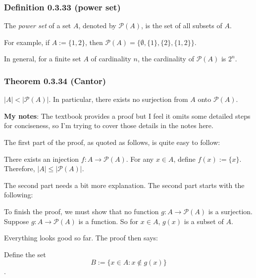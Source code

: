 \documentclass[12pt, letterpaper, oneside]{book}
\begin{document}
\subsubsection{Definition 0.3.33 (power set)}

The \textit{power set} of a set $A$, denoted by $\mathcal{P}(A)$, is the set of
all subsets of $A$.

For example, if $A := \{1, 2\}$, then $\mathcal{P}(A) = \{\emptyset, \{1\},
  \{2\}, \{1, 2\}\}$.

In general, for a finite set $A$ of cardinality $n$, the cardinality of
$\mathcal{P}(A)$ is $2^n$.

\subsubsection{Theorem 0.3.34 (Cantor)}

$|A| < |\mathcal{P}(A)|$. In particular, there exists no surjection from $A$
onto $\mathcal{P}(A)$.

\colorbox{lime!100}{\textbf{My notes}}: The textbook provides a proof but I
feel it omits some detailed steps for conciseness, so I'm trying to cover those
details in the notes here.

The first part of the proof, as quoted as follows, is quite easy to follow:

\begin{displayquote}
  There exists an injection $f: A \rightarrow \mathcal{P}(A)$. For any $x \in
    A$, define $f(x) := \{x\}$. Therefore, $|A| \leq |\mathcal{P}(A)|$.
\end{displayquote}

The second part needs a bit more explanation. The second part starts with the
following:

\begin{displayquote}
  To finish the proof, we must show that no function $g: A \rightarrow
    \mathcal{P}(A)$ is a surjection. Suppose $g: A \rightarrow \mathcal{P}(A)$ is
  a function. So for $x \in A$, $g(x)$ is a subset of $A$.
\end{displayquote}

Everything looks good so far. The proof then says:

\begin{displayquote}
  Define the set \[B:= \{x \in A: x \notin g(x)\}\].
\end{displayquote}
\end{document}
